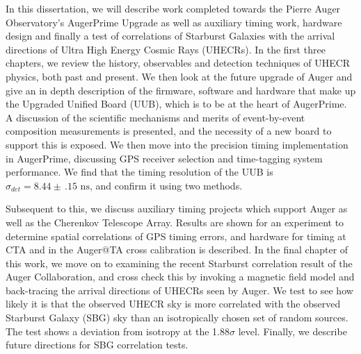 
\newpage
\begin{center}
		\begin{singlespace}
	{\huge\thetitle\unskip\strut\par}
		\end{singlespace}
	{%
	\large%
	{\expandafter\MakeUppercase\expandafter{\theauthor}}%
	\unskip\strut\par%

	}
\end{center}

\bigskip
\begin{center}
	\bfseries \abstractname\vspace{-.5em}\vspace{0pt}
\end{center}
In this dissertation, we will describe work completed towards the Pierre Auger Observatory's AugerPrime Upgrade as well as auxiliary timing work, hardware design and finally a test of correlations of Starburst Galaxies with the arrival directions of Ultra High Energy Cosmic Rays (UHECRs). In the first three chapters, we review the history, observables and detection techniques of UHECR physics, both past and present. We then look at the future upgrade of Auger and give an in depth description of the firmware, software and hardware that make up the Upgraded Unified Board (UUB), which is to be at the heart of AugerPrime. A discussion of the scientific mechanisms and merits of event-by-event composition measurements is presented, and the necessity of a new board to support this is exposed. We then move into the precision timing implementation in AugerPrime, discussing GPS receiver selection and time-tagging system performance. We find that the timing resolution of the UUB is $\sigma_{det}=8.44\pm\,.15\mbox{ ns}$, and confirm it using two methods. 

Subsequent to this, we discuss auxiliary timing projects which support Auger as well as the Cherenkov Telescope Array. Results are shown for an experiment to determine spatial correlations of GPS timing errors, and hardware for timing at CTA and in the Auger@TA cross calibration is described. In the final chapter of this work, we move on to examining the recent Starburst correlation result of the Auger Collaboration, and cross check this by invoking a magnetic field model and back-tracing the arrival directions of UHECRs seen by Auger. We test to see how likely it is that the observed UHECR sky is more correlated with the observed Starburst Galaxy (SBG) sky than an isotropically chosen set of random sources. The test shows a deviation from isotropy at the 1.88$\sigma$ level. Finally, we describe future directions for SBG correlation tests.
